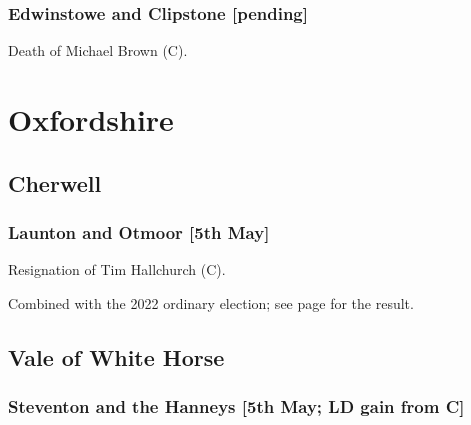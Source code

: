 \documentclass[a4paper,openany]{book}
\begin{document}
\begin{resultsiii}
\subsubsection*{Edwinstowe and Clipstone \hspace*{\fill}\nolinebreak[1]%
	\enspace\hspace*{\fill}
	[pending]}


Death of Michael Brown (C).

\section{Oxfordshire}

\subsection*{Cherwell}

\subsubsection*{Launton and Otmoor \hspace*{\fill}\nolinebreak[1]%
	\enspace\hspace*{\fill}
	[5th May]}


Resignation of Tim Hallchurch (C).

Combined with the 2022 ordinary election; see page \pageref{CherwellLauntonOtmoor} for the result.

\subsection*{Vale of White Horse}

\subsubsection*{Steventon and the Hanneys \hspace*{\fill}\nolinebreak[1]%
	\enspace\hspace*{\fill}
	[5th May; LD gain from C]}



\end{resultsiii}
\end{document}
